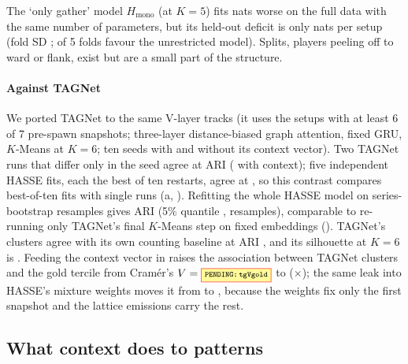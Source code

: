 The `only gather' model $H_{\mathrm{mono}}$ (at $K=5$) fits  nats worse on the full data with the same number of parameters, but its held-out deficit is only  nats per setup (fold SD ;  of 5 folds favour the unrestricted model).
Splits, players peeling off to ward or flank, exist but are a small part of the structure.


\paragraph*{Against TAGNet}
We ported TAGNet to the same V-layer tracks (it uses the  setups with at least 6 of 7 pre-spawn snapshots; three-layer distance-biased graph attention, fixed GRU, $K$-Means at $K=6$; ten seeds with and without its context vector).
Two TAGNet runs that differ only in the seed agree at ARI \citep{hubert1985comparing}  ( with context); five independent HASSE fits, each the best of ten restarts, agree at , so this contrast compares best-of-ten fits with single runs (a, ).
Refitting the whole HASSE model on series-bootstrap resamples gives ARI  (5\% quantile ,  resamples), comparable to re-running only TAGNet's final $K$-Means step on fixed embeddings ().
TAGNet's clusters agree with its own counting baseline at ARI , and its silhouette at $K=6$ is .
Feeding the context vector in raises the association between TAGNet clusters and the gold tercile from Cramér's $V=\V{tgVgold}$ to  ($\times$); the same leak into HASSE's mixture weights moves it from  to , because the weights fix only the first snapshot and the lattice emissions carry the rest.

\subsection{What context does to patterns}
\label{sec:context}


